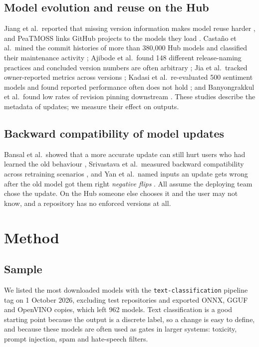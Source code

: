 \documentclass[conference]{IEEEtran}
\newcommand{\code}[1]{\texttt{#1}}
\begin{document}
\subsection{Model evolution and reuse on the Hub}
Jiang et al.\ reported that missing version information makes model reuse harder \cite{jiang2023}, and PeaTMOSS links GitHub projects to the models they load \cite{peatmoss}. Castaño et al.\ mined the commit histories of more than 380,000 Hub models and classified their maintenance activity \cite{castano2024}; Ajibode et al.\ found 148 different release-naming practices and concluded version numbers are often arbitrary \cite{ajibode2024}; Jia et al.\ tracked owner-reported metrics across versions \cite{jia2025}; Kadasi et al.\ re-evaluated 500 sentiment models and found reported performance often does not hold \cite{kadasi2025}; and Banyongrakkul et al.\ found low rates of revision pinning downstream \cite{banyongrakkul2026}. These studies describe the metadata of updates; we measure their effect on outputs.

\subsection{Backward compatibility of model updates}
Bansal et al.\ showed that a more accurate update can still hurt users who had learned the old behaviour \cite{bansal2019}, Srivastava et al.\ measured backward compatibility across retraining scenarios \cite{srivastava2020}, and Yan et al.\ named inputs an update gets wrong after the old model got them right \emph{negative flips} \cite{yan2021}. All assume the deploying team chose the update. On the Hub someone else chooses it and the user may not know, and a repository has no enforced versions at all.

\section{Method}

\subsection{Sample}
We listed the most downloaded models with the \code{text-classification} pipeline tag on 1 October 2026, excluding test repositories and exported ONNX, GGUF and OpenVINO copies, which left 962 models. Text classification is a good starting point because the output is a discrete label, so a change is easy to define, and because these models are often used as gates in larger systems: toxicity, prompt injection, spam and hate-speech filters.
\end{document}
